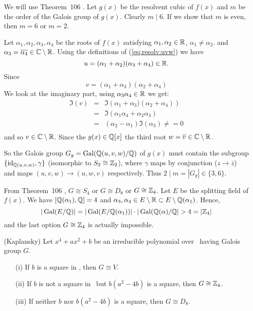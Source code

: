 \begin{myenumerate}
We will use Theorem~106 \cite{Rotman98}.
Let \(g(x)\) be the resolvent cubic of \(f(x)\)
and $m$ be the order of the Galois group of \(g(x)\).
Clearly \(m \mid 6\).
If we show that $m$ is even, then \(m=6\) or \(m=2\).

Let \(\alpha_1,\alpha_2,\alpha_3,\alpha_4\) be the roots of \(f(x)\) satisfying
\(\alpha_1,\alpha_2\in \mathbb{R}\), \(\alpha_1 \neq \alpha_2\).
and \(\alpha_3 = \overline{\alpha_4} \in \mathbb{C} \setminus \mathbb{R}\).
Using the definitions of (\ref{eq:resolv:uvw})
we have
\begin{equation*}
u = (\alpha_1 + \alpha_2)(\alpha_3 + \alpha_4) \in \mathbb{R}.
\end{equation*}
Since
\begin{equation*}
 v =  (\alpha_1 + \alpha_3)(\alpha_2 + \alpha_4)
\end{equation*}
We look at the imaginary part, using \(\alpha_3\alpha_4 \in \mathbb{R}\) we get:
\begin{eqnarray*}
 \Im(v)
 & = & \Im\left(\alpha_1 + \alpha_3)(\alpha_2 + \alpha_4)\right) \\
 & = & \Im(\alpha_1\alpha_4 + \alpha_2\alpha_3) \\
 & = & (\alpha_2 - \alpha_1)\Im(\alpha_3) \neq = 0\\
\end{eqnarray*}
and so \(v \in \mathbb{C}\setminus \mathbb{R}\).
Since the \(g(x)\in \mathbb{Q}[x]\) the third root
\(w = \overline{v} \in \mathbb{C}\setminus\mathbb{R}\).

So the Galois group \(G_g = \mathop{\rm Gal}\nolimits(\mathbb{Q}(u,v,w)/\mathbb{Q})\) of \(g(x)\) must contain the
subgroup
\(\{\mathop{\rm id}\nolimits_{\mathbb{Q}(u,v,w)},\gamma\}\)
(isomorphic to \(S_2 \cong \mathbb{Z}_2\)),
where \(\gamma\) maps by conjunction (\(z \rightarrow \overline{z}\))
and maps \((u,v,w) \rightarrow (u,w,v)\) respectively.
Thus \(2 \mid m = |G_g| \in \{3,6\}\).

From Theorem~106 \cite{Rotman98},
\(G \cong S_4\) or \(G \cong D_8\) or \(G \cong \mathbb{Z}_4\).
Let $E$ be the splitting field of \(f(x)\).
We have \([\mathbb{Q}(\alpha_1),\mathbb{Q}] = 4\) and
\(\alpha_3,\alpha_4 \in E \setminus \mathbb{R} \subset E \setminus \mathbb{Q}(\alpha_1)\).
Hence,
\begin{equation*}
|\mathop{\rm Gal}\nolimits(E/\mathbb{Q})| = |\mathop{\rm Gal}\nolimits(E/\mathbb{Q}(\alpha_1))| \cdot |\mathop{\rm Gal}\nolimits(\mathbb{Q}(\alpha)/\mathbb{Q}| > 4 = |\mathbb{Z}_4|
\end{equation*}
and the last option \(G \cong \mathbb{Z}_4\) is actually impossible.


\item
\begin{excopy}
(Kaplansky)
Let \(x^4 + ax^2 + b\) be an irreducible polynomial over \Q\ having
Galois group $G$.
\begin{itemize}
 \item[(i)] If $b$ is a square in \Q, then \(G \cong V\).
 \item[(ii)]
   If $b$ is not a square in \Q\ but \(b(a^2-4b)\) is a square,
   then \(G \cong \mathbb{Z}_4\).
 \item[(iii)]
   If neither $b$ nor \(b(a^2-4b)\) is a square, then \(G \cong D_8\).
\end{itemize}
\end{excopy}


\end{myenumerate}
